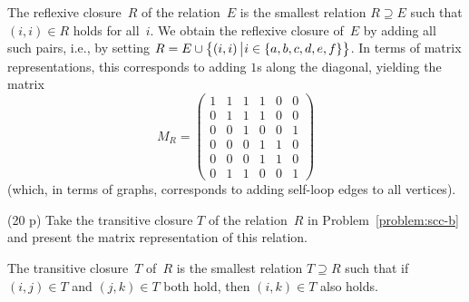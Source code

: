 \documentclass{jn-pset}
\begin{document}
\begin{problem}
  \begin{solution}
    The reflexive closure~$R$ of the relation~$E$ is the smallest
    relation $R \supseteq E$ such that
    $(i, i) \in R$ holds for all~$i$.
    We obtain the reflexive closure of~$E$ by adding all such pairs, i.e.,
    by setting
    $R = E \union \Setdescr{(i, i)}{i \in \set{a, b, c, d, e, f}}$.
    In terms of matrix representations, this corresponds to adding
    $1$s along the diagonal, yielding the matrix    
  \begin{equation}
    \label{eq:adjacency-matrix-reflexive-closure}
    M_R =
    \begin{pmatrix}
       1 & 1 & 1 & 1 & 0 & 0 \\
       0 & 1 & 1 & 1 & 0 & 0 \\
       0 & 0 & 1 & 0 & 0 & 1 \\
       0 & 0 & 0 & 1 & 1 & 0 \\
       0 & 0 & 0 & 1 & 1 & 0 \\
       0 & 1 & 1 & 0 & 0 & 1 
    \end{pmatrix}
  \end{equation}
  (which, in terms of graphs, corresponds to adding self-loop edges to all vertices).
\end{solution}

  \begin{subproblem}
    {(20 p)}
    {\ignorespaces}
    \label{problem:scc-c}%
%       
    Take the transitive closure $T$ of the relation~$R$ in
    Problem~\ref{problem:scc-b}
    and 
    present the matrix representation of this relation.
%
  \end{subproblem}

  
  \begin{solution}
    The transitive closure~$T$ of~$R$ is the smallest
    relation $T \supseteq R$ such that
    if
    $(i, j) \in T$
    and
    $(j, k) \in T$
    both hold, then
    $(i, k) \in T$
    also holds.


\end{solution}
\end{problem}
\end{document}
